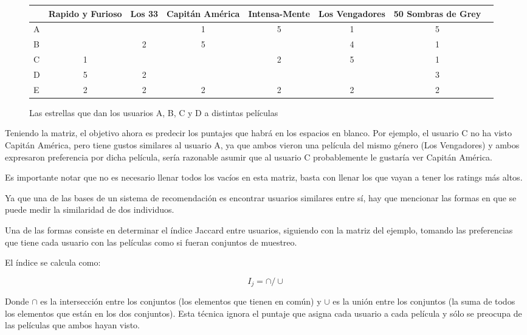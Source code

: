 \begin{figure}
\centering
\begin{tabular}{l*{6}{c}r}
                  & Rapido y Furioso & Los 33 & Capitán América & Intensa-Mente & Los Vengadores  & 50 Sombras de Grey  \\
\hline
A          &  &  & 1 & 5 & 1 & 5   \\
B          &  & 2 & 5 &  & 4  & 1   \\
C              & 1 &  &  & 2 & 5  &1   \\
D       & 5 & 2 &  &  &   & 3   \\
E		 & 2 & 2 & 2 & 2 & 2  & 2   \\

\end{tabular}
\caption{Las estrellas que dan los usuarios A, B, C y D a distintas películas}
\end{figure}

Teniendo la matriz, el objetivo ahora es predecir los puntajes que habrá en los espacios en blanco. Por ejemplo, el usuario C no ha visto Capitán América, pero tiene gustos similares al usuario A, ya que ambos vieron una película del mismo género (Los Vengadores) y ambos expresaron preferencia por dicha película, sería razonable asumir que al usuario C probablemente le gustaría ver Capitán América.

Es importante notar que no es necesario llenar todos los vacíos en esta matriz, basta con llenar los que vayan a tener los ratings más altos.

Ya que una de las bases de un sistema de recomendación es encontrar usuarios similares entre sí, hay que mencionar las formas en que se puede medir la similaridad de dos individuos.

Una de las formas consiste en determinar el índice Jaccard entre usuarios, siguiendo con la matriz del ejemplo,  tomando las preferencias que tiene cada usuario con las películas como si fueran conjuntos de muestreo. 

El índice se calcula como:

\begin{equation}
I_j = \cap / \cup
\end{equation}

Donde $\cap$ es la intersección entre los conjuntos (los elementos que tienen en común) y $\cup$ es la unión entre los conjuntos (la suma de todos los elementos que están en los dos conjuntos). Esta técnica ignora el puntaje que asigna cada usuario a cada película y sólo se preocupa de las películas que ambos hayan visto.

